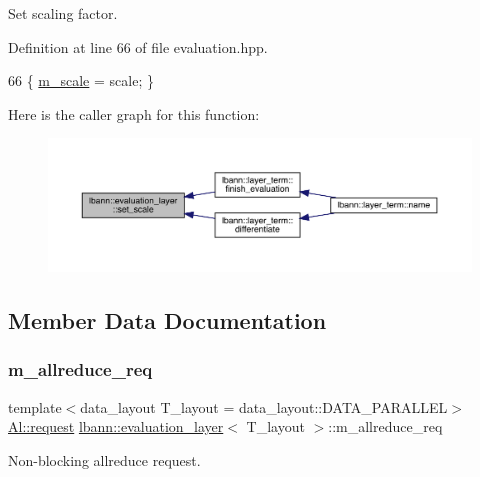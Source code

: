 Set scaling factor. 

Definition at line 66 of file evaluation.\+hpp.


\begin{DoxyCode}
66 \{ \hyperlink{classlbann_1_1evaluation__layer_af365bda5700dca43434b01f0a2b1ee45}{m\_scale} = scale; \}
\end{DoxyCode}
Here is the caller graph for this function\+:\nopagebreak
\begin{figure}[H]
\begin{center}
\leavevmode
\includegraphics[width=350pt]{classlbann_1_1evaluation__layer_a47fe13276e74f749f6fceebc25c63bcf_icgraph}
\end{center}
\end{figure}


\subsection{Member Data Documentation}
\mbox{\label{classlbann_1_1evaluation__layer_a3f2143da6cab67a7e1407a73116a2469}} 
\subsubsection{\texorpdfstring{m\+\_\+allreduce\+\_\+req}{m\_allreduce\_req}}
{\footnotesize\ttfamily template$<$data\+\_\+layout T\+\_\+layout = data\+\_\+layout\+::\+D\+A\+T\+A\+\_\+\+P\+A\+R\+A\+L\+L\+EL$>$ \\
\hyperlink{structlbann_1_1Al_1_1request}{Al\+::request} \hyperlink{classlbann_1_1evaluation__layer}{lbann\+::evaluation\+\_\+layer}$<$ T\+\_\+layout $>$\+::m\+\_\+allreduce\+\_\+req\hspace{0.3cm}{\ttfamily [private]}}

Non-\/blocking allreduce request. 

